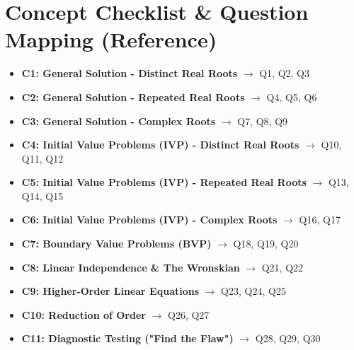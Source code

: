 \documentclass[11pt]{article}
\begin{document}
\section{Concept Checklist \& Question Mapping (Reference)}
\begin{itemize}
    \item \textbf{C1: General Solution - Distinct Real Roots} $\rightarrow$ Q1, Q2, Q3
    \item \textbf{C2: General Solution - Repeated Real Roots} $\rightarrow$ Q4, Q5, Q6
    \item \textbf{C3: General Solution - Complex Roots} $\rightarrow$ Q7, Q8, Q9
    \item \textbf{C4: Initial Value Problems (IVP) - Distinct Real Roots} $\rightarrow$ Q10, Q11, Q12
    \item \textbf{C5: Initial Value Problems (IVP) - Repeated Real Roots} $\rightarrow$ Q13, Q14, Q15
    \item \textbf{C6: Initial Value Problems (IVP) - Complex Roots} $\rightarrow$ Q16, Q17
    \item \textbf{C7: Boundary Value Problems (BVP)} $\rightarrow$ Q18, Q19, Q20
    \item \textbf{C8: Linear Independence \& The Wronskian} $\rightarrow$ Q21, Q22
    \item \textbf{C9: Higher-Order Linear Equations} $\rightarrow$ Q23, Q24, Q25
    \item \textbf{C10: Reduction of Order} $\rightarrow$ Q26, Q27
    \item \textbf{C11: Diagnostic Testing ("Find the Flaw")} $\rightarrow$ Q28, Q29, Q30
\end{itemize}
\end{document}
